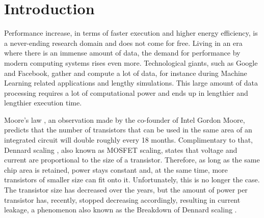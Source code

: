 \documentclass[]{usiinfthesis}
\begin{document}
\tableofcontents 

\mainmatter

%
%
%  
%
%
%

\chapter*{Introduction}

Performance increase, in terms of faster execution and higher energy efficiency, 
is a never-ending research domain and does not come for free.
Living in an era where there is an immense amount of data, the demand for %
performance by modern computing systems rises even more.
Technological giants, such as Google and Facebook, gather and compute a lot of data, for instance 
during Machine Learning related applications and lengthy simulations. This large amount of data
processing requires a lot of computational power and ends up in lengthier and lengthier execution
 time.\par

Moore's law \cite{schaller1997moore}, an observation made by the co-founder of Intel Gordon Moore, 
predicts that the number of transistors that can be used in the same area of an integrated 
circuit will double roughly every 18 months. Complimentary to that, Dennard scaling 
\cite{dennard1974design}, 
also known as MOSFET scaling, states that voltage and current are 
proportional to the size of a transistor. Therefore, as long as the same chip area is retained, 
power stays constant and, at the same time, more transistors of smaller size can fit onto it.
Unfortunately, this is no longer the case. The transistor size has decreased over 
the years, but the amount of power per transistor has, recently, stopped decreasing accordingly,  
resulting in current leakage, a phenomenon also known as the 
Breakdown of Dennard scaling \cite{esmaeilzadeh2011dark}.\par
\end{document}
